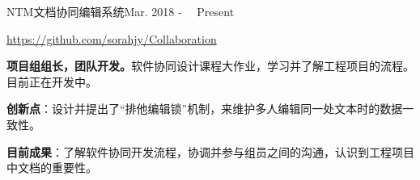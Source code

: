 \documentclass{sorahjy_cv}
\begin{document}
\begin{sectionContentSimple}{NTM文档协同编辑系统}{Mar. 2018 - \ \ Present \ }
	\item \url{https://github.com/sorahjy/Collaboration}
	\item \textbf{项目组组长，团队开发。}软件协同设计课程大作业，学习并了解工程项目的流程。目前正在开发中。
	\item \textbf{创新点}：设计并提出了“排他编辑锁”机制，来维护多人编辑同一处文本时的数据一致性。
	\item \textbf{目前成果}：了解软件协同开发流程，协调并参与组员之间的沟通，认识到工程项目中文档的重要性。
\end{sectionContentSimple}



%
%



%
%






\end{document}
